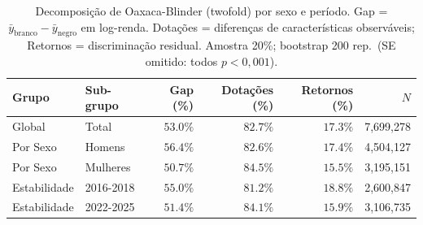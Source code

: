 \begin{table}[H]
\centering
\caption{Decomposição de Oaxaca-Blinder (twofold) por sexo e período.
         Gap = $\bar{y}_{\text{branco}} - \bar{y}_{\text{negro}}$ em log-renda.
         Dotações = diferenças de características observáveis;
         Retornos = discriminação residual.
         Amostra 20\%; bootstrap 200 rep.\ (SE omitido: todos $p<0{,}001$).}
\label{tab:ob_melhorias}
\small
\begin{tabular}{llrrrr}
\toprule
Grupo & Sub-grupo & Gap (\%) & Dotações (\%) & Retornos (\%) & $N$ \\
\midrule
Global & Total & $53.0\%$ & $82.7\%$ & $17.3\%$ & 7,699,278 \\
Por Sexo & Homens & $56.4\%$ & $82.6\%$ & $17.4\%$ & 4,504,127 \\
Por Sexo & Mulheres & $50.7\%$ & $84.5\%$ & $15.5\%$ & 3,195,151 \\
Estabilidade & 2016-2018 & $55.0\%$ & $81.2\%$ & $18.8\%$ & 2,600,847 \\
Estabilidade & 2022-2025 & $51.4\%$ & $84.1\%$ & $15.9\%$ & 3,106,735 \\
\bottomrule
\end{tabular}
\end{table}
